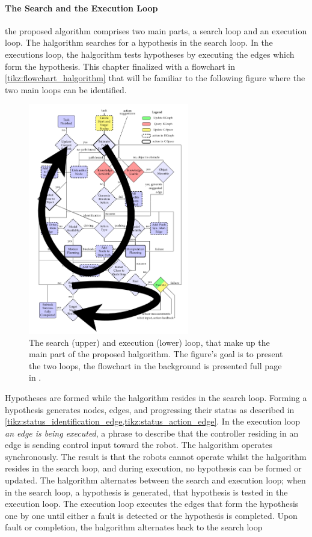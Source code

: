 \paragraph{The Search and the Execution Loop}
the proposed algorithm comprises two main parts, a search loop and an execution loop. The \ac{halgorithm} searches for a hypothesis in the search loop. In the executions loop, the \ac{halgorithm} tests hypotheses by executing the edges which form the hypothesis. This chapter finalized with a flowchart in \cref{tikz:flowchart_halgorithm} that will be familiar to the following figure where the two main loops can be identified.\bs

\begin{figure}[h]
    \centering
    \includegraphics[width=7cm]{figures/proposed_method/two_loops_identified}
  \caption{The search (upper) and execution (lower) loop, that make up the main part of the proposed \ac{halgorithm}. The figure's goal is to present the two loops, the flowchart in the background is presented full page in .}%
    \label{fig:two_loops_identified}
\end{figure}

Hypotheses are formed while the \ac{halgorithm} resides in the search loop. Forming a hypothesis generates nodes, edges, and progressing their status as described in \cref{tikz:status_identification_edge,tikz:status_action_edge}. In the execution loop \textit{an edge is being executed}, a phrase to describe that the controller residing in an edge is sending control input toward the robot. The \ac{halgorithm} operates synchronously. The result is that the robots cannot operate whilst the \ac{halgorithm} resides in the search loop, and during execution, no hypothesis can be formed or updated. The \ac{halgorithm} alternates between the search and execution loop; when in the search loop, a hypothesis is generated, that hypothesis is tested in the execution loop. The execution loop executes the edges that form the hypothesis one by one until either a fault is detected or the hypothesis is completed. Upon fault or completion, the \ac{halgorithm} alternates back to the search loop\bs

